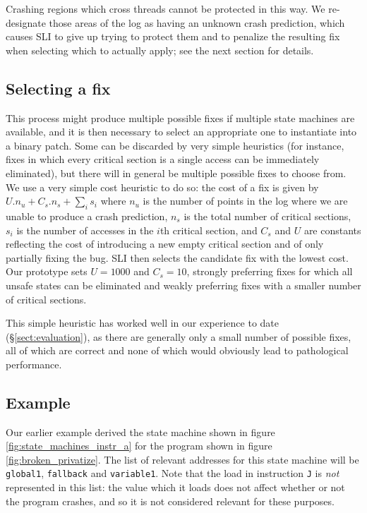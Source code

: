 \documentclass[10pt,twocolumn,preprint,natbib,authoryear]{sigplanconf}
\begin{document}
Crashing regions which cross threads cannot be protected in this way.
We re-designate those areas of the log as having an unknown crash
prediction, which causes SLI to give up trying to protect them and to
penalize the resulting fix when selecting which to actually apply; see
the next section for details.


\subsection{Selecting a fix}
\label{sect:selectfix}

This process might produce multiple possible fixes if multiple state
machines are available, and it is then necessary to select an
appropriate one to instantiate into a binary patch.  Some can be
discarded by very simple heuristics (for instance, fixes in which
every critical section is a single access can be immediately
eliminated), but there will in general be multiple possible fixes to
choose from.  We use a very simple cost heuristic to do so: the cost
of a fix is given by $U.n_u + C_s.n_s + {\sum_{i}}s_i$ where $n_u$ is
the number of points in the log where we are unable to produce a crash
prediction, $n_s$ is the total number of critical sections, $s_i$ is
the number of accesses in the $i$th critical section, and $C_s$ and
$U$ are constants reflecting the cost of introducing a new empty
critical section and of only partially fixing the bug.  SLI then
selects the candidate fix with the lowest cost.  Our prototype sets
$U=1000$ and $C_s=10$, strongly preferring fixes for which all unsafe
states can be eliminated and weakly preferring fixes with a smaller
number of critical sections.

This simple heuristic has worked well in our experience to date
(\S\ref{sect:evaluation}), as there are generally only a small number
of possible fixes, all of which are correct and none of which would
obviously lead to pathological performance.

\subsection{Example}
\label{sect:final_example}

Our earlier example derived the state machine shown in figure
\ref{fig:state_machines_instr_a} for the program shown in figure
\ref{fig:broken_privatize}.  The list of relevant addresses for this
state machine will be \verb|global1|, \verb|fallback| and
\verb|variable1|.  Note that the load in instruction \verb|J| is
\emph{not} represented in this list: the value which it loads does not
affect whether or not the program crashes, and so it is not considered
relevant for these purposes.
\end{document}
